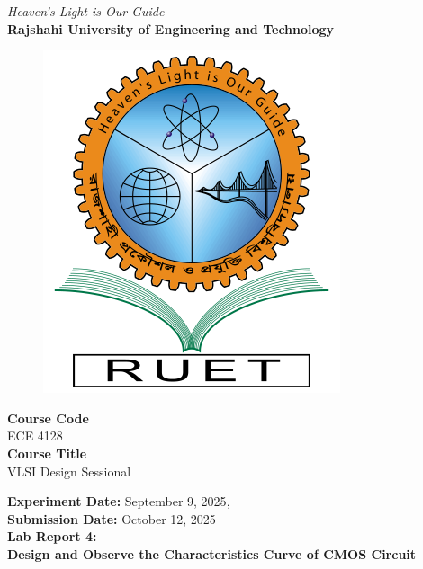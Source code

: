 \vspace*{\fill}
\begin{center}

    \emph{Heaven's Light is Our Guide} \\
    \textbf{Rajshahi University of Engineering and Technology} \\

    \begin{figure}[H]
        \centering
        \includegraphics[scale=.34]{images/RUET_logo.png}
        \label{fig:ruet_logo}
    \end{figure}
    \vspace{5mm}

    \textbf{Course Code}\\
    ECE 4128\\
    \vspace{3mm}
    \textbf{Course Title}\\
    VLSI Design Sessional

    \vspace{5mm}
    \textbf{Experiment Date:} {September 9, 2025},\\
    \textbf{Submission Date:} {October 12, 2025}\\

    \vspace{5mm}
    \textbf{Lab Report 4: \\
        Design and Observe the Characteristics Curve of CMOS Circuit}

    \vspace{15mm}


\end{center}
